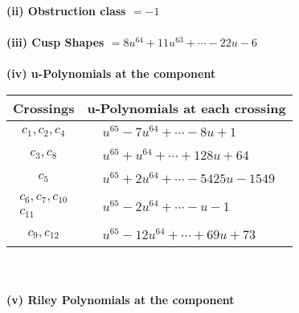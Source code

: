 \documentclass[1p]{elsarticle_modified}
\theoremstyle{definition}
\begin{document}
\flushleft \textbf{(ii) Obstruction class $= -1$}\\~\\
\flushleft \textbf{(iii) Cusp Shapes $= 8 u^{64}+11 u^{63}+\cdots-22 u-6$}\\~\\
\newpage\renewcommand{\arraystretch}{1}
\flushleft \textbf{(iv) u-Polynomials at the component}\newline \\
\begin{tabular}{m{50pt}|m{274pt}}
Crossings & \hspace{64pt}u-Polynomials at each crossing \\
\hline $$\begin{aligned}c_{1},c_{2},c_{4}\end{aligned}$$&$\begin{aligned}
&u^{65}-7 u^{64}+\cdots-8 u+1
\end{aligned}$\\
\hline $$\begin{aligned}c_{3},c_{8}\end{aligned}$$&$\begin{aligned}
&u^{65}+u^{64}+\cdots+128 u+64
\end{aligned}$\\
\hline $$\begin{aligned}c_{5}\end{aligned}$$&$\begin{aligned}
&u^{65}+2 u^{64}+\cdots-5425 u-1549
\end{aligned}$\\
\hline $$\begin{aligned}c_{6},c_{7},c_{10}\\c_{11}\end{aligned}$$&$\begin{aligned}
&u^{65}-2 u^{64}+\cdots- u-1
\end{aligned}$\\
\hline $$\begin{aligned}c_{9},c_{12}\end{aligned}$$&$\begin{aligned}
&u^{65}-12 u^{64}+\cdots+69 u+73
\end{aligned}$\\
\hline
\end{tabular}\\~\\
\newpage\renewcommand{\arraystretch}{1}
\flushleft \textbf{(v) Riley Polynomials at the component}\newline \\
\end{document}
